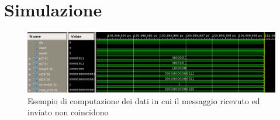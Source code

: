 %

\section{Simulazione}

\begin{figure}[H]
	\centering
	\includegraphics[scale=0.55]{esercizio17/images/RSA_testbench.png}
	\caption{Esempio di computazione dei dati in cui il messaggio ricevuto ed inviato non coincidono}
\end{figure}%


